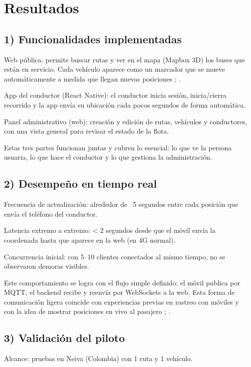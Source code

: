\section{Resultados}

\subsection{1) Funcionalidades implementadas}
Web pública: permite buscar rutas y ver en el mapa (Mapbox 3D) los buses que están en servicio. Cada vehículo aparece como un marcador que se mueve automáticamente a medida que llegan nuevas posiciones \cite{cityruta2018}; \cite{stopbus2016}.

App del conductor (React Native): el conductor inicia sesión, inicia/cierra recorrido y la app envía su ubicación cada pocos segundos de forma automática.

Panel administrativo (web): creación y edición de rutas, vehículos y conductores, con una vista general para revisar el estado de la flota.

Estas tres partes funcionan juntas y cubren lo esencial: lo que ve la persona usuaria, lo que hace el conductor y lo que gestiona la administración.

\subsection{2) Desempeño en tiempo real}
Frecuencia de actualización: alrededor de ~5 segundos entre cada posición que envía el teléfono del conductor.

Latencia extremo a extremo: < 2 segundos desde que el móvil envía la coordenada hasta que aparece en la web (en 4G normal).

Concurrencia inicial: con 5–10 clientes conectados al mismo tiempo, no se observaron demoras visibles.

Este comportamiento se logra con el flujo simple definido: el móvil publica por MQTT, el backend recibe y reenvía por WebSockets a la web. Esta forma de comunicación ligera coincide con experiencias previas en rastreo con móviles \cite{sismo2016} y con la idea de mostrar posiciones en vivo al pasajero \cite{cityruta2018}; \cite{stopbus2016}.

\subsection{3) Validación del piloto}
Alcance: pruebas en Neiva (Colombia) con 1 ruta y 1 vehículo.

